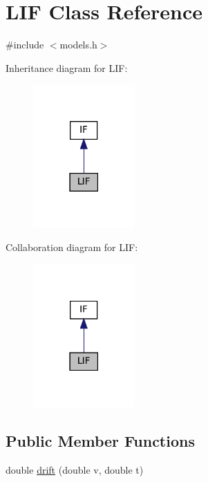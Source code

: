 \hypertarget{classLIF}{}\section{L\+IF Class Reference}
\label{classLIF}


{\ttfamily \#include $<$models.\+h$>$}



Inheritance diagram for L\+IF\+:
\nopagebreak
\begin{figure}[H]
\begin{center}
\leavevmode
\includegraphics[width=110pt]{classLIF__inherit__graph}
\end{center}
\end{figure}


Collaboration diagram for L\+IF\+:
\nopagebreak
\begin{figure}[H]
\begin{center}
\leavevmode
\includegraphics[width=110pt]{classLIF__coll__graph}
\end{center}
\end{figure}
\subsection*{Public Member Functions}
\begin{DoxyCompactItemize}
\item 
double \mbox{\hyperlink{classLIF_aea677a0cf3f943edb7a957479e18d6dc}{drift}} (double v, double t)
\end{DoxyCompactItemize}

